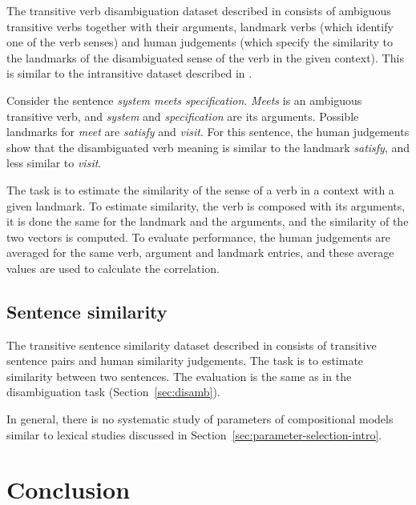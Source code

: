 The transitive verb disambiguation dataset
described in \citet{Grefenstette:2011:ETV:2140490.2140497,Grefenstette:2011:ESC:2145432.2145580} consists of ambiguous transitive verbs together with their arguments, landmark verbs (which identify one of the verb senses) and human judgements (which specify the similarity to the landmarks of the disambiguated sense of the verb in the given context). This is similar to the intransitive dataset described in .

Consider the sentence \textit{system meets specification}. \textit{Meets} is an ambiguous transitive verb, and \textit{system}
and \textit{specification} are its arguments. Possible landmarks for \emph{meet} are \textit{satisfy} and \textit{visit}. For this sentence, the human judgements show that the disambiguated verb meaning is similar to the landmark \textit{satisfy}, and less similar to \textit{visit}.

The task is to estimate the similarity of the sense of a verb in a context with a given landmark. To estimate similarity, the verb is composed with its arguments, it is done the same for the landmark and the arguments, and the similarity of the two vectors is computed. To evaluate performance, the human judgements are averaged for the same verb, argument and landmark entries, and these average values are used to calculate the correlation.

\subsection{Sentence similarity}
\label{sec:sentence-similarity}

The transitive sentence similarity dataset described in  consists of transitive sentence pairs and human similarity judgements. The task is to estimate similarity between two sentences. The evaluation is the same as in the disambiguation task (Section~\ref{sec:disamb}).

In general, there is no systematic study of parameters of compositional models similar to lexical studies discussed in Section~\ref{sec:parameter-selection-intro}.

\section{Conclusion}
\label{sec:conclusion-comp}

